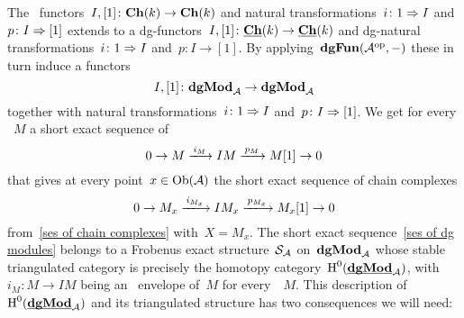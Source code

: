 \documentclass[a4paper,10pt]{scrartcl}
\begin{document}
The~{\klinear} functors~$I, [1] \colon \mathbf{Ch}(k) \to \mathbf{Ch}(k)$ and natural transformations~$i \colon 1 \Rightarrow I$ and~$p \colon I \Rightarrow [1]$ extends to a dg-functors~$I, [1] \colon \underline{\mathbf{Ch}}(k) \to \underline{\mathbf{Ch}}(k)$ and dg-natural transformations~$i \colon 1 \Rightarrow I$ and~$p \colon I \to [1]$.
By applying~$\mathbf{dgFun}(\mathcal{A}^{{\mathrm{op}}}, -)$ these in turn induce a {\klinear} functors
\[
  I, [1]
  \colon
  \mathbf{dgMod}_{\mathcal{A}}
  \to
  \mathbf{dgMod}_{\mathcal{A}}
\]
together with natural transformations~$i \colon 1 \Rightarrow I$ and~$p \colon I \Rightarrow [1]$.
We get for every {\dgmodule{$\Acat$}}~$M$ a short exact sequence of~{\dgmodules{$\Acat$}}
\begin{equation}
  \label{ses of dg modules}
  0
  \to
  M
  \xlongto{i_M}
  IM
  \xlongto{p_M}
  M[1]
  \to
  0
\end{equation}
that gives at every point~$x \in \operatorname{Ob}(\mathcal{A})$ the short exact sequence of chain complexes
\[
  0
  \to
  M_x
  \xlongto{i_{M_x}}
  IM_x
  \xlongto{p_{M_x}}
  M_x[1]
  \to
  0
\]
from~\eqref{ses of chain complexes} with~$X = M_x$.
The short exact sequence~\eqref{ses of dg modules} belongs to a Frobenus exact structure~$\Sfrob_{\Acat}$ on~$\mathbf{dgMod}_{\mathcal{A}}$ whose stable triangulated category is precisely the homotopy category~$\operatorname{H}^0(\underline{\smash{\mathbf{dgMod}}}_{\mathcal{A}})$, with~$i_M \colon M \to IM$ being an~{\injective{$\Sfrob_{\Acat}$}} envelope of~$M$ for every~{\dgmodule{$\Acat$}}~$M$.
This description of~$\operatorname{H}^0(\underline{\smash{\mathbf{dgMod}}}_{\mathcal{A}})$ and its triangulated structure has two consequences we will need:
\end{document}
